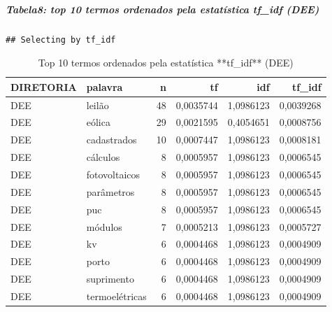 \documentclass[]{article}
\newenvironment{Shaded}{\begin{snugshade}}{\end{snugshade}}
\newcommand{\KeywordTok}[1]{\textcolor[rgb]{0.13,0.29,0.53}{\textbf{#1}}}
\newcommand{\DataTypeTok}[1]{\textcolor[rgb]{0.13,0.29,0.53}{#1}}
\newcommand{\DecValTok}[1]{\textcolor[rgb]{0.00,0.00,0.81}{#1}}
\newcommand{\StringTok}[1]{\textcolor[rgb]{0.31,0.60,0.02}{#1}}
\newcommand{\OperatorTok}[1]{\textcolor[rgb]{0.81,0.36,0.00}{\textbf{#1}}}
\newcommand{\NormalTok}[1]{#1}
\let\oldsubparagraph\subparagraph
\renewcommand{\subparagraph}[1]{\oldsubparagraph{#1}\mbox{}}
\begin{document}
\subparagraph{\texorpdfstring{Tabela8: top 10 termos ordenados pela
estatística \textbf{tf\_idf}
(DEE)}{Tabela8: top 10 termos ordenados pela estatística tf\_idf (DEE)}}\label{tabela8-top-10-termos-ordenados-pela-estatistica-tf_idf-dee}

\begin{Shaded}
\end{Shaded}

\begin{verbatim}
## Selecting by tf_idf
\end{verbatim}

\begin{table}[!h]

\caption{\label{tab:unnamed-chunk-34}Top 10 termos ordenados pela estatística **tf_idf** (DEE)}
\centering
\begin{tabular}{llrrrr}
\toprule
DIRETORIA & palavra & n & tf & idf & tf\_idf\\
\midrule
\rowcolor{gray!6}  DEE & leilão & 48 & 0,0035744 & 1,0986123 & 0,0039268\\
DEE & eólica & 29 & 0,0021595 & 0,4054651 & 0,0008756\\
\rowcolor{gray!6}  DEE & cadastrados & 10 & 0,0007447 & 1,0986123 & 0,0008181\\
DEE & cálculos & 8 & 0,0005957 & 1,0986123 & 0,0006545\\
\rowcolor{gray!6}  DEE & fotovoltaicos & 8 & 0,0005957 & 1,0986123 & 0,0006545\\
\addlinespace
DEE & parâmetros & 8 & 0,0005957 & 1,0986123 & 0,0006545\\
\rowcolor{gray!6}  DEE & puc & 8 & 0,0005957 & 1,0986123 & 0,0006545\\
DEE & módulos & 7 & 0,0005213 & 1,0986123 & 0,0005727\\
\rowcolor{gray!6}  DEE & kv & 6 & 0,0004468 & 1,0986123 & 0,0004909\\
DEE & porto & 6 & 0,0004468 & 1,0986123 & 0,0004909\\
\addlinespace
\rowcolor{gray!6}  DEE & suprimento & 6 & 0,0004468 & 1,0986123 & 0,0004909\\
DEE & termoelétricas & 6 & 0,0004468 & 1,0986123 & 0,0004909\\
\bottomrule
\end{tabular}
\end{table}
\end{document}
